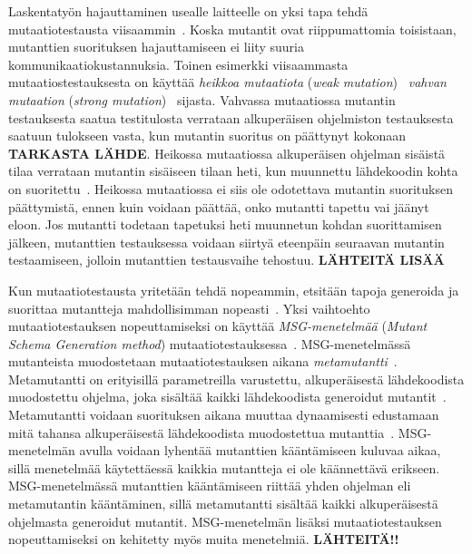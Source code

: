 \documentclass[finnish, grading]{tktltiki2}
\theoremstyle{definition}
\theoremstyle{remark}
\begin{document}
Laskentatyön hajauttaminen usealle laitteelle on yksi tapa tehdä mutaatiotestausta viisaammin~\cite[s. 38]{Offutt:Untch:2001}. Koska mutantit ovat riippumattomia toisistaan, mutanttien suorituksen hajauttamiseen ei liity suuria kommunikaatiokustannuksia. Toinen esimerkki viisaammasta mutaatiostestauksesta on käyttää \textit{heikkoa mutaatiota} (\textit{weak mutation})~\cite[s. 37]{Offutt:Untch:2001} \textit{vahvan mutaation} (\textit{strong mutation})~\cite[s. 655]{Jia:Harman:2011} sijasta. Vahvassa mutaatiossa mutantin testauksesta saatua testitulosta verrataan alkuperäisen ohjelmiston testauksesta saatuun tulokseen vasta, kun mutantin suoritus on päättynyt kokonaan~\cite[s. 37]{Offutt:Untch:2001}\textbf{ TARKASTA LÄHDE}. Heikossa mutaatiossa alkuperäisen ohjelman sisäistä tilaa verrataan mutantin sisäiseen tilaan heti, kun muunnettu lähdekoodin kohta on suoritettu~\cite[s. 38]{Offutt:Untch:2001}. Heikossa mutaatiossa ei siis ole odotettava mutantin suorituksen päättymistä, ennen kuin voidaan päättää, onko mutantti tapettu vai jäänyt eloon. Jos mutantti todetaan tapetuksi heti muunnetun kohdan suorittamisen jälkeen, mutanttien testauksessa voidaan siirtyä eteenpäin seuraavan mutantin testaamiseen, jolloin mutanttien testausvaihe tehostuu. \textbf{LÄHTEITÄ LISÄÄ}

Kun mutaatiotestausta yritetään tehdä nopeammin, etsitään tapoja generoida ja suorittaa mutantteja mahdollisimman nopeasti~\cite[s. 37]{Offutt:Untch:2001}. Yksi vaihtoehto mutaatiotestauksen nopeuttamiseksi on käyttää \textit{MSG-menetelmää} (\textit{Mutant Schema Generation method}) mutaatiotestauksessa~\cite[s. 38]{Offutt:Untch:2001}. MSG-menetelmässä mutanteista muodostetaan mutaatiotestauksen aikana \textit{metamutantti}~\cite[s. 104]{Ma:Offutt:Kwon:2005:MuAutomated}. Metamutantti on erityisillä parametreilla varustettu, alkuperäisestä lähdekoodista muodostettu ohjelma, joka sisältää kaikki lähdekoodista generoidut mutantit~\cite[s. 104]{Ma:Offutt:Kwon:2005:MuAutomated}. Metamutantti voidaan suorituksen aikana muuttaa dynaamisesti edustamaan mitä tahansa alkuperäisestä lähdekoodista muodostettua mutanttia~\cite[s. 106]{Ma:Offutt:Kwon:2005:MuAutomated}. MSG-menetelmän avulla voidaan lyhentää mutanttien kääntämiseen kuluvaa aikaa, sillä menetelmää käytettäessä kaikkia mutantteja ei ole käännettävä erikseen. MSG-menetelmässä mutanttien kääntämiseen riittää yhden ohjelman eli metamutantin kääntäminen, sillä metamutantti sisältää kaikki alkuperäisestä ohjelmasta generoidut mutantit. MSG-menetelmän lisäksi mutaatiotestauksen nopeuttamiseksi on kehitetty myös muita menetelmiä. \textbf{LÄHTEITÄ!!}
\end{document}
